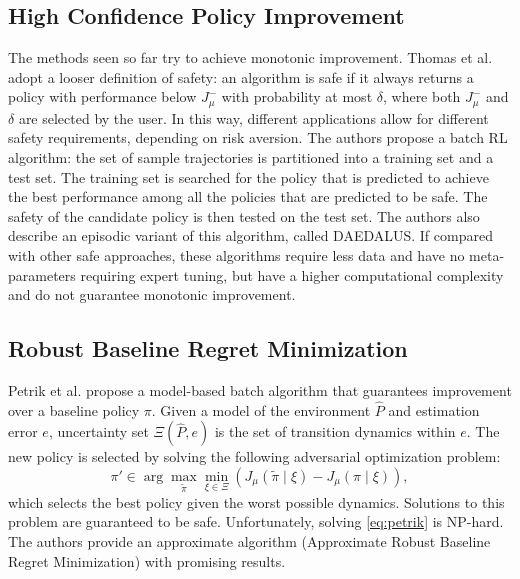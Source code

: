 \subsection{High Confidence Policy Improvement}
The methods seen so far try to achieve monotonic improvement. Thomas et al. \cite{thomas2015high} adopt a looser definition of safety: an algorithm is safe if it always returns a policy with performance below $J_{\mu}^-$ with probability at most $\delta$, where both $J_{\mu}^-$ and $\delta$ are selected by the user. In this way, different applications allow for different safety requirements, depending on risk aversion. The authors propose a batch \ac{RL} algorithm: the set of sample trajectories is partitioned into a training set and a test set. The training set is searched for the policy that is predicted to achieve the best performance among all the policies that are predicted to be safe. The safety of the candidate policy is then tested on the test set. The authors also describe an episodic variant of this algorithm, called DAEDALUS. If compared with other safe approaches, these algorithms require less data and have no meta-parameters requiring expert tuning, but have a higher computational complexity and do not guarantee monotonic improvement. 

\subsection{Robust Baseline Regret Minimization}
Petrik et al. \cite{petrik2016safe} propose a model-based batch algorithm that guarantees improvement over a baseline policy $\pi$.
Given a model of the environment $\hat{P}$ and estimation error $e$, uncertainty set $\Xi(\hat{P},e)$ is the set of transition dynamics within $e$.  The new policy is selected by solving the following adversarial optimization problem:
\begin{equation}\label{eq:petrik}
\pi' \in \arg\max\limits_{\tilde{\pi}}\min_{\xi \in \Xi}
	\left(J_{\mu}(\tilde{\pi}\mid \xi)- J_{\mu}(\pi\mid \xi)\right), 
\end{equation}
which selects the best policy given the worst possible dynamics. Solutions to this problem are guaranteed to be safe. Unfortunately, solving \ref{eq:petrik} is NP-hard. The authors provide an approximate algorithm (Approximate Robust Baseline Regret Minimization) with promising results.